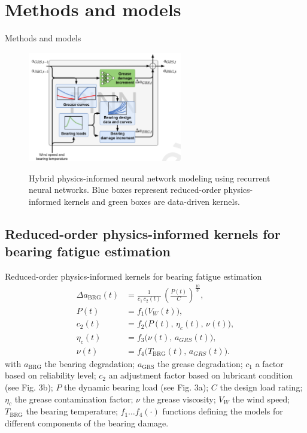 \documentclass[aspectratio=169,xcolor=dvipsnames]{beamer}
\begin{document}
\section{Methods and models}
\begin{frame}{Methods and models}
    \begin{figure}
        \centering
        \includegraphics[width=0.6\textwidth]{include/PINN.png}
        \label{fig:pinn}
        \caption{Hybrid physics-informed neural network modeling using recurrent neural networks. Blue boxes represent reduced-order physics-informed kernels and green boxes are data-driven kernels. \cite{YUCESAN2023110921}}
    \end{figure}
\end{frame}

\subsection{Reduced-order physics-informed kernels for bearing fatigue estimation}
\begin{frame}{Reduced-order physics-informed kernels for bearing fatigue estimation}
    \begin{align}
    \Delta a_{\mathrm{BRG}}(t)
    &= \frac{1}{c_1\,c_2(t)}\, \left(\frac{P(t)}{C}\right)^{\frac{10}{3}}, \\[4pt]
    P(t) &= f_1\big(V_W(t)\big), \\[4pt]
    c_2(t) &= f_2\big(P(t),\,\eta_c(t),\,\nu(t)\big), \\[4pt]
    \eta_c(t) &= f_3\big(\nu(t),\,a_{GRS}(t)\big), \\[4pt]
    \nu(t) &= f_4\big(T_{\mathrm{BRG}}(t),\,a_{GRS}(t)\big). 
    \end{align}
    with $a_{\mathrm{BRG}}$ the bearing degradation; $a_{\mathrm{GRS}}$ the grease degradation; $c_1$ a factor based on reliability level; $c_2$ an adjustment factor based on lubricant condition (see Fig. 3b); $P$ the dynamic bearing load (see Fig. 3a); $C$ the design load rating; $\eta_c$ the grease contamination factor; $\nu$ the grease viscosity; $V_W$ the wind speed; $T_{\mathrm{BRG}}$ the bearing temperature; $f_1\ldots f_4(\cdot)$ functions defining the models for different components of the bearing damage.
\end{frame}
\end{document}
